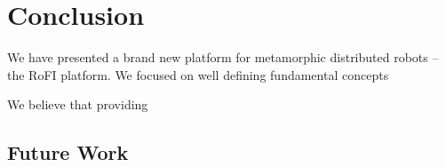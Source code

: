 \chapter{Conclusion}\label{chap:conclusion}

We have presented a brand new platform for metamorphic distributed robots -- the
RoFI platform. We focused on well defining fundamental concepts

We believe that providing

\section{Future Work}